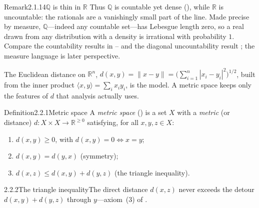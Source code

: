 \documentclass[main.tex]{subfiles}
\begin{document}
\begin{ObjL}{Remark}{2.1.14}{$\mathbb Q$ is thin in $\mathbb R$}
Thus $\mathbb Q$ is countable yet dense (), while $\mathbb R$ is uncountable: the
rationals are a vanishingly small part of the line. Made precise by measure, $\mathbb Q$---indeed
any countable set---has Lebesgue length zero, so a real drawn from any distribution with a density
is irrational with probability $1$. Compare the countability results in -- and
the diagonal uncountability result ; the measure language is later perspective.
\end{ObjL}


\noindent The Euclidean distance on $\mathbb R^n$, $d(x,y)=\|x-y\|=\big(\sum_{i=1}^n|x_i-y_i|^2\big)^{1/2}$,
built from the inner product $\langle x,y\rangle=\sum_i x_iy_i$, is the model. A metric space keeps
only the features of $d$ that analysis actually uses.

\begin{Obj}{Definition}{2.2.1}{Metric space}
A \emph{metric space} () is a set $X$ with a \emph{metric} (or distance)
$d:X\times X\to\mathbb R^{\ge0}$ satisfying, for all $x,y,z\in X$:
\begin{enumerate}
  \item $d(x,y)\ge0$, with $d(x,y)=0\iff x=y$;
  \item $d(x,y)=d(y,x)$ \quad(symmetry);
  \item $d(x,z)\le d(x,y)+d(y,z)$ \quad(the triangle inequality).
\end{enumerate}
\end{Obj}

\begin{Fig}{2.2.2}{The triangle inequality}{The direct distance $d(x,z)$ never exceeds the detour $d(x,y)+d(y,z)$ through $y$---axiom~(3) of .}
\end{Fig}
\end{document}
